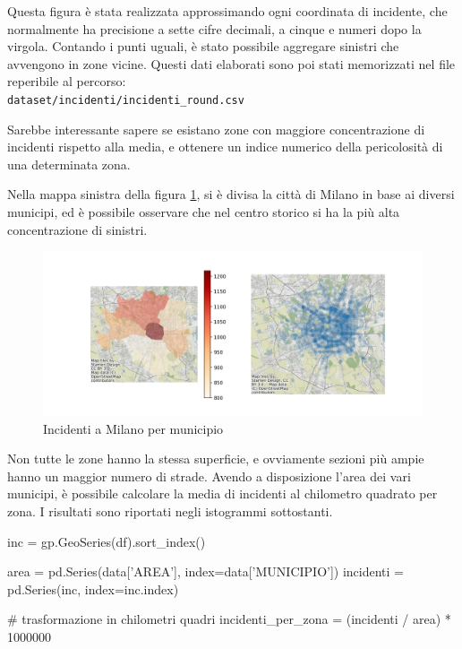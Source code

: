 \documentclass[a4paper,12pt]{report}
\newcommand{\filenamestyle}[1]{\texttt{#1}}
\begin{document}
Questa figura è stata realizzata approssimando ogni coordinata di incidente, che  
normalmente ha precisione a sette cifre decimali, a cinque e numeri dopo la virgola. 
Contando i punti uguali, è stato possibile aggregare sinistri che avvengono in zone 
vicine. 
Questi dati elaborati sono poi stati memorizzati nel file reperibile al 
percorso:\\ 
\filenamestyle{dataset/incidenti/incidenti\_round.csv} 

Sarebbe interessante sapere se esistano zone con maggiore concentrazione 
di incidenti rispetto alla media, e ottenere un indice numerico 
della pericolosità di una determinata zona. 

Nella mappa sinistra della figura \ref{fig:heatmap-municipi}, si è divisa 
la città di Milano in base ai diversi municipi, ed è possibile 
osservare che nel centro storico si ha la più alta concentrazione di sinistri. 

\begin{figure}
    \includegraphics[width=\linewidth]{../src/municipi_milano/incidenti_municipio.png}
    \caption{Incidenti a Milano per municipio}
    \label{fig:heatmap-municipi}
\end{figure}

Non tutte le zone hanno la stessa superficie, e ovviamente sezioni più ampie hanno un maggior 
numero di strade. Avendo a disposizione l'area dei vari municipi, 
è possibile calcolare la media di incidenti al chilometro quadrato per zona. 
I risultati sono riportati negli istogrammi sottostanti. 

\begin{code}    
inc = gp.GeoSeries(df).sort_index()

area = pd.Series(data['AREA'], index=data['MUNICIPIO'])
incidenti = pd.Series(inc, index=inc.index)

# trasformazione in chilometri quadri
incidenti_per_zona = (incidenti / area) * 1000000 
\end{code}
\end{document}
